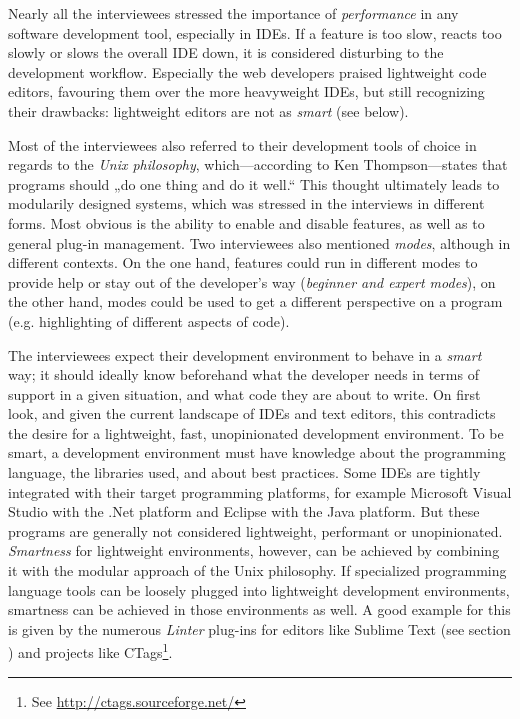 Nearly all the interviewees stressed the importance of
\emph{performance} in any software development tool, especially in IDEs.
If a feature is too slow, reacts too slowly or slows the overall IDE
down, it is considered disturbing to the development workflow.
Especially the web developers praised lightweight code editors,
favouring them over the more heavyweight IDEs, but still recognizing
their drawbacks: lightweight editors are not as \emph{smart} (see
below).

Most of the interviewees also referred to their development tools of
choice in regards to the \emph{Unix philosophy}, which—according to Ken
Thompson—states that programs should „do one thing and do it well.“
\cite{raymond} This thought ultimately leads to modularily designed
systems, which was stressed in the interviews in different forms. Most
obvious is the ability to enable and disable features, as well as to
general plug-in management. Two interviewees also mentioned
\emph{modes}, although in different contexts. On the one hand, features
could run in different modes to provide help or stay out of the
developer’s way (\emph{beginner and expert modes}), on the other hand,
modes could be used to get a different perspective on a program (e.g.
highlighting of different aspects of code).

The interviewees expect their development environment to behave in a
\emph{smart} way; it should ideally know beforehand what the developer
needs in terms of support in a given situation, and what code they are
about to write. On first look, and given the current landscape of IDEs
and text editors, this contradicts the desire for a lightweight, fast,
unopinionated development environment. To be smart, a development
environment must have knowledge about the programming language, the
libraries used, and about best practices. Some IDEs are tightly
integrated with their target programming platforms, for example
Microsoft Visual Studio with the .Net platform and Eclipse with the Java
platform. But these programs are generally not considered lightweight,
performant or unopinionated. \emph{Smartness} for lightweight
environments, however, can be achieved by combining it with the modular
approach of the Unix philosophy. If specialized programming language
tools can be loosely plugged into lightweight development environments,
smartness can be achieved in those environments as well. A good example
for this is given by the numerous \emph{Linter} plug-ins for editors
like Sublime Text (see section ) and projects like
CTags\footnote{See \url{http://ctags.sourceforge.net/}}.

